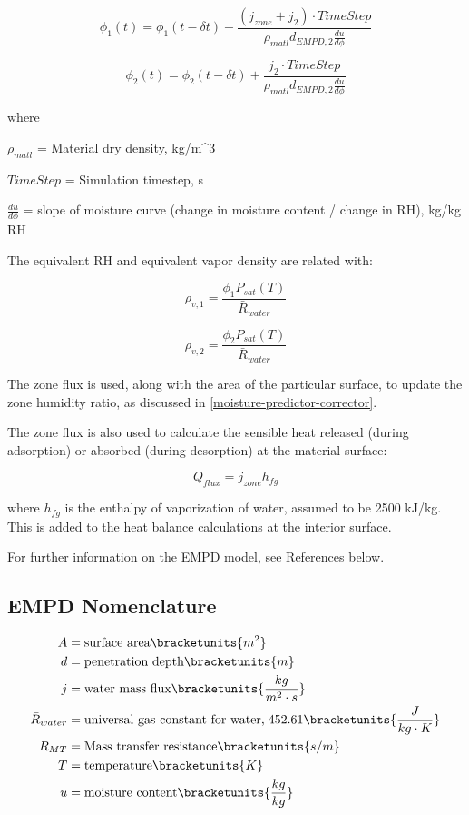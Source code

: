 {\begin{equation}
\phi_{1}(t) = \phi_{1}(t-\delta t) - \frac { (j_{zone} + j_{2}) \cdot TimeStep} {\rho_{matl} d_{EMPD,2} \frac {du}{d\phi}}
\end{equation}

\begin{equation}
\phi_{2}(t) = \phi_{2}(t-\delta t) + \frac { j_{2} \cdot TimeStep} {\rho_{matl} d_{EMPD,2} \frac {du}{d\phi}}
\end{equation}

where

$\rho_{matl}$ = Material dry density, kg/m^3

$TimeStep$ = Simulation timestep, s

$\frac {du}{d\phi}$ = slope of moisture curve (change in moisture content / change in RH), kg/kg \cdot RH

The equivalent RH and equivalent vapor density are related with:

\begin{equation}
\rho_{v,1} = \frac {\phi_{1} P_{sat}(T)} {\bar R_{water}}
\end{equation}

\begin{equation}
\rho_{v,2} = \frac {\phi_{2} P_{sat}(T)} {\bar R_{water}}
\end{equation}

The zone flux is used, along with the area of the particular surface, to update the zone humidity ratio, as discussed in \ref{moisture-predictor-corrector}.

The zone flux is also used to calculate the sensible heat released (during adsorption) or absorbed (during desorption) at the material surface:

\begin{equation}
Q_{flux} = j_{zone} h_{fg}
\end{equation}

where $h_{fg}$ is the enthalpy of vaporization of water, assumed to be 2500 kJ/kg. This is added to the heat balance calculations at the interior surface.

For further information on the EMPD model, see References below.

\subsection{EMPD Nomenclature}\label{empd-nomenclature}
\begin{align*}  
  A  &= \text{surface area} \bracketunits{m^{2}} \\
  d &= \text{penetration depth} \bracketunits{m} \\
  j &= \text{water mass flux} \bracketunits{\frac{kg}{m^{2} \cdot s}} \\
  \bar R_{water} &= \text{universal gas constant for water,} \; 452.61 \bracketunits{\frac{J}{kg \cdot K}}   \\
  R_{MT} &= \text{Mass transfer resistance} \bracketunits{s/m} \\
  T &= \text{temperature} \bracketunits{K} \\
  u &= \text{moisture content} \bracketunits{\frac{kg}{kg}}
\end{align*}

}
